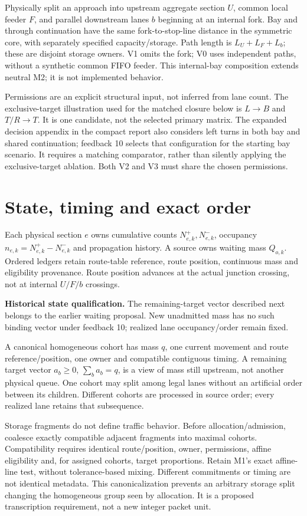 \documentclass[10pt,a4paper]{article}
\begin{document}
Physically split an approach into upstream aggregate section $U$, common
local feeder $F$, and parallel downstream lanes $b$ beginning at an internal
fork. Bay and through continuation have the same fork-to-stop-line distance
in the symmetric core, with separately specified capacity/storage. Path
length is $L_U+L_F+L_b$; these are disjoint storage owners. V1 omits the fork;
V0 uses independent paths, without a synthetic common FIFO feeder. This
internal-bay composition extends neutral M2; it is not implemented behavior.

Permissions are an explicit structural input, not inferred from lane count.
The exclusive-target illustration used for the matched closure below is
$L\to B$ and $T/R\to T$. It is one candidate, not the selected primary
matrix. The expanded decision appendix in the compact report also considers
left turns in both bay and shared continuation; feedback 10 selects that
configuration for the starting bay scenario. It requires a
matching comparator, rather than silently applying the exclusive-target
ablation. Both V2 and V3 must share the chosen permissions.

\section{State, timing and exact order}

Each physical section $e$ owns cumulative counts $N^+_{e,k},N^-_{e,k}$,
occupancy $n_{e,k}=N^+_{e,k}-N^-_{e,k}$ and propagation history. A source
owns waiting mass $Q_{o,k}$. Ordered ledgers retain route-table reference,
route position, continuous mass and eligibility provenance. Route position
advances at the actual junction crossing, not at internal $U/F/b$ crossings.

\textbf{Historical state qualification.}
The remaining-target vector described next belongs to the earlier waiting
proposal. New unadmitted mass has no such binding vector under feedback 10;
realized lane occupancy/order remain fixed.

A canonical homogeneous cohort has mass $q$, one current movement and
route reference/position, one owner and compatible contiguous timing. A
remaining target vector $a_b\geq0$, $\sum_ba_b=q$, is a view of mass still
upstream, not another physical queue. One cohort may split among legal lanes
without an artificial order between its children. Different cohorts are
processed in source order; every realized lane retains that subsequence.

Storage fragments do not define traffic behavior. Before allocation/admission,
coalesce exactly compatible adjacent fragments into maximal cohorts.
Compatibility requires identical route/position, owner, permissions, affine
eligibility and, for assigned cohorts, target proportions. Retain M1's exact
affine-line test, without tolerance-based mixing. Different commitments or
timing are not identical metadata. This canonicalization prevents an
arbitrary storage split changing the homogeneous group seen by allocation.
It is a proposed transcription requirement, not a new integer packet unit.
\end{document}
